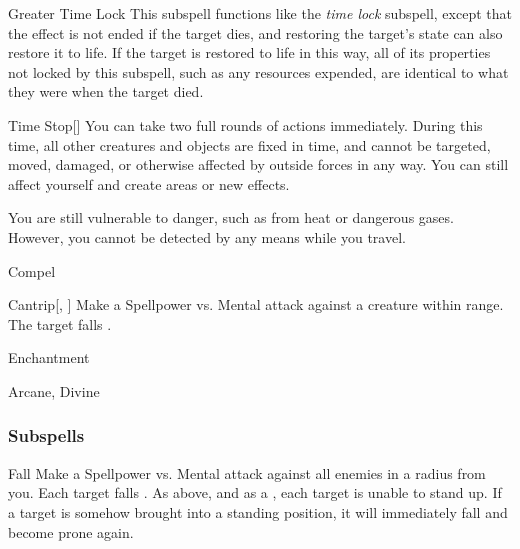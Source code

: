 \begin{ability}[\nth{9}]{Greater Time Lock}
This subspell functions like the \textit{time lock} subspell, except that the effect is not ended if the target dies, and restoring the target's state can also restore it to life.
If the target is restored to life in this way, all of its properties not locked by this subspell, such as any resources expended, are identical to what they were when the target died.
\end{ability}
\vspace{0.25em}


\begin{ability}[\nth{9}]{Time Stop}[]
You can take two full rounds of actions immediately.
During this time, all other creatures and objects are fixed in time, and cannot be targeted, moved, damaged, or otherwise affected by outside forces in any way.
You can still affect yourself and create areas or new effects.

You are still vulnerable to danger, such as from heat or dangerous gases.
However, you cannot be detected by any means while you travel.
\end{ability}
\vspace{0.25em}

\newpage
\begin{spellsection}{Compel}

\begin{spellheader}
\end{spellheader}


\begin{ability}{Cantrip}[, ]
Make a Spellpower vs. Mental attack against a creature within \rngmed range.
\hit The target falls .
\end{ability}




 Enchantment

 Arcane, Divine
\end{spellsection}


\subsubsection{Subspells}


\begin{ability}[\nth{1}]{Fall}
Make a Spellpower vs. Mental attack against all enemies in a \areamed radius from you.
\hit Each target falls .
\crit As above, and as a , each target is unable to stand up.
If a target is somehow brought into a standing position, it will immediately fall and become prone again.
\end{ability}
\vspace{0.25em}


